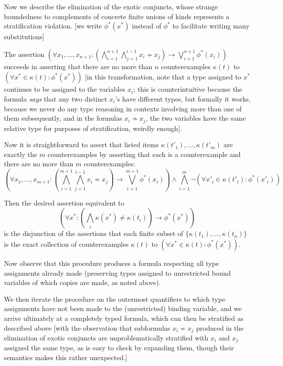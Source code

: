 \documentclass[12pt]{article}
\begin{document}
\begin{description}
Now we describe the elimination of the exotic conjuncts, whose strange boundedness to complements of concrete finite unions of kinds represents a stratification violation. [we write $\phi^*(x^*)$ instead of $\phi^*$ to facilitate writing many substitutions]  

The assertion $(\forall x_1,\ldots,x_{n+1}: (\bigwedge_{i=1}^{n+1} \bigwedge_{j=1}^{i-1} x_i \not\sim x_j) \rightarrow \bigvee_{i=1}^{n+1}\phi^*(x_i))$   succeeds in asserting that there are no more than $n$ counterexamples $\kappa(t)$ to $(\forall x^* \in \kappa(t):\phi^*(x^*))$ [in this transformation, note that a type assigned to $x^*$ continues to be assigned to the variables $x_i$; this is counterintuitive because the formula {\em says\/} that any  two distinct $x_i$'s have different types, but formally it works, because we never do any type reasoning in contexts involving more than one of them subsequently, and in the formulas $x_i \not\sim x_j$, the two variables have the same relative type for purposes of stratification, weirdly enough].

Now it is straightforward to assert that listed items $\kappa(t'_1),\ldots,\kappa(t'_m)$ are exactly the $m$ counterexamples by asserting that each is a counterexample and there are no more than $m$ counterexamples:   $$(\forall x_1,\ldots,x_{m+1}: (\bigwedge_{i=1}^{m+1} \bigwedge_{j=1}^{i-1} x_i \not\sim x_j) \rightarrow \bigvee_{i=1}^{m+1}\phi^*(x_i))\wedge \bigwedge_{i=1}^m \neg(\forall x'_i \in \kappa(t'_i):\phi^*(x'_i))$$

Then the desired assertion equivalent to $$(\forall x^*:(\bigwedge_i \kappa(x^*) \neq \kappa(t_i))\rightarrow \phi^*(x^*))$$  is the disjunction of the assertions that each finite subset of $\{\kappa(t_1),\ldots,\kappa(t_n)\}$ is the exact collection of counterexamples $\kappa(t)$  to $(\forall x^* \in \kappa(t):\phi^*(x^*))$.

Now observe that this procedure produces a formula respecting all type assignments already made (preserving types assigned to unrestricted bound variables of which copies are made, as noted above).

We then iterate the procedure on the outermost quantifiers to which type assignments have not been made to the (unrestricted) binding variable, and we arrive ultimately at a completely typed formula, which can then be stratified as described above [with the observation 
that subformulas $x_i \not\sim x_j$ produced in the elimination of exotic conjuncts are unproblematically stratified with $x_i$ and $x_j$ assigned the same type, as is easy to check by expanding them, though their semantics makes this rather unexpected.]


\end{description}
\end{document}
